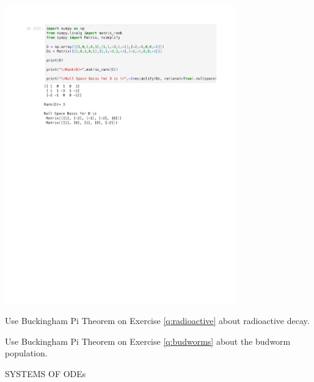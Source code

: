 \documentclass{workbook}
\begin{document}
\begin{solution}
\begin{slide}
\includegraphics[width=0.75\textwidth]{python/sphere-dimensionanalysis.pdf}

	
\end{slide}
\end{solution}


\begin{slide}

\question

\begin{parts}
	\item Use Buckingham Pi Theorem on Exercise \ref{q:radioactive} about radioactive decay.
	\item Use Buckingham Pi Theorem on Exercise \ref{q:budworms} about the budworm population.
\end{parts}
	
\end{slide}




\begin{slide}

SYSTEMS OF ODEs
	
\end{slide}
\end{document}
